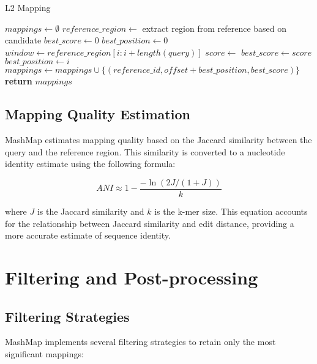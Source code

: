 \documentclass{article}
\begin{document}
\begin{algorithm}
\caption{L2 Mapping}
\begin{algorithmic}[1]
\State $mappings \gets \emptyset$
    \State $reference\_region \gets$ extract region from reference based on candidate
    \State $best\_score \gets 0$
    \State $best\_position \gets 0$
        \State $window \gets reference\_region[i:i+length(query)]$
        \State $score \gets$ 
            \State $best\_score \gets score$
            \State $best\_position \gets i$
        \EndIf
    \EndFor
        \State $mappings \gets mappings \cup \{(reference\_id, offset + best\_position, best\_score)\}$
    \EndIf
\EndFor
\State \textbf{return} $mappings$
\EndProcedure
\end{algorithmic}
\end{algorithm}

\subsection{Mapping Quality Estimation}

MashMap estimates mapping quality based on the Jaccard similarity between the query and the reference region. This similarity is converted to a nucleotide identity estimate using the following formula:

\begin{equation}
ANI \approx 1 - \frac{-\ln(2J/(1+J))}{k}
\end{equation}

where $J$ is the Jaccard similarity and $k$ is the k-mer size. This equation accounts for the relationship between Jaccard similarity and edit distance, providing a more accurate estimate of sequence identity.

\section{Filtering and Post-processing}

\subsection{Filtering Strategies}

MashMap implements several filtering strategies to retain only the most significant mappings:
\end{document}
